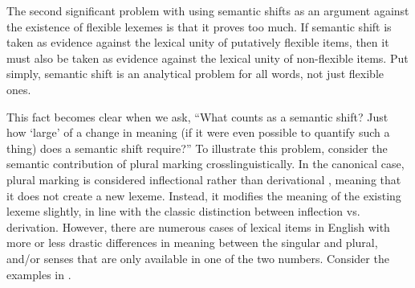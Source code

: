 The second significant problem with using semantic shifts as an argument against the existence of flexible lexemes is that it proves too much. If semantic shift is taken as evidence against the lexical unity of putatively flexible items, then it must also be taken as evidence against the lexical unity of non-flexible items. Put simply, semantic shift is an analytical problem for all words, not just flexible ones.

This fact becomes clear when we ask, \enquote{What counts as a semantic shift? Just how \enquote{large} of a change in meaning (if it were even possible to quantify such a thing) does a semantic shift require?} To illustrate this problem, consider the semantic contribution of plural marking crosslinguistically. In the canonical case, plural marking is considered inflectional rather than derivational \parencite[2]{Corbett2000}, meaning that it does not create a new lexeme. Instead, it modifies the meaning of the existing lexeme slightly, in line with the classic distinction between inflection vs. derivation. However, there are numerous cases of lexical items in English with more or less drastic differences in meaning between the singular and plural, and/or senses that are only available in one of the two numbers. Consider the examples in .

